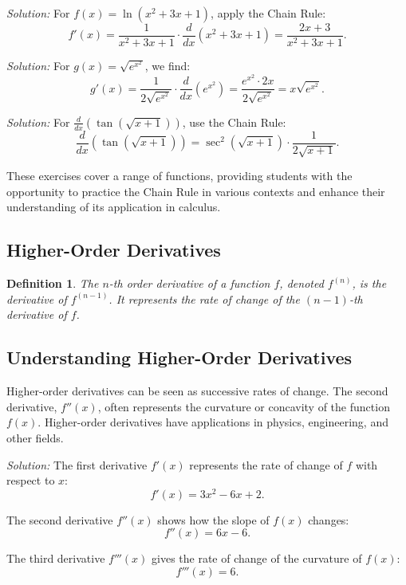 \documentclass[a4paper,12pt]{book}
\newenvironment{solution}[1][]
{\par\noindent\textit{Solution:} \rmfamily}{\medskip}
\newcounter{example}
\newtheorem{definition}{Definition}
\begin{document}
\begin{solution}[to Exercise 2]
For \( f(x) = \ln(x^2 + 3x + 1) \), apply the Chain Rule:
\[ f'(x) = \frac{1}{x^2 + 3x + 1} \cdot \frac{d}{dx}(x^2 + 3x + 1) = \frac{2x + 3}{x^2 + 3x + 1}. \]
\end{solution}

\begin{solution}[to Exercise 3]
For \( g(x) = \sqrt{e^{x^2}} \), we find:
\[ g'(x) = \frac{1}{2\sqrt{e^{x^2}}} \cdot \frac{d}{dx}(e^{x^2}) = \frac{e^{x^2} \cdot 2x}{2\sqrt{e^{x^2}}} = x \sqrt{e^{x^2}}. \]
\end{solution}

\begin{solution}[to Exercise 4]
For \( \frac{d}{dx} \left( \tan(\sqrt{x + 1}) \right) \), use the Chain Rule:
\[ \frac{d}{dx} \left( \tan(\sqrt{x + 1}) \right) = \sec^2(\sqrt{x + 1}) \cdot \frac{1}{2\sqrt{x + 1}}. \]
\end{solution}

These exercises cover a range of functions, providing students with the opportunity to practice the Chain Rule in various contexts and enhance their understanding of its application in calculus.

\subsection{Higher-Order Derivatives}

\begin{definition}
The \( n \)-th order derivative of a function \( f \), denoted \( f^{(n)} \), is the derivative of \( f^{(n-1)} \). It represents the rate of change of the \( (n-1) \)-th derivative of \( f \).
\end{definition}

\subsection{Understanding Higher-Order Derivatives}
Higher-order derivatives can be seen as successive rates of change. The second derivative, \( f''(x) \), often represents the curvature or concavity of the function \( f(x) \). Higher-order derivatives have applications in physics, engineering, and other fields.


\begin{solution}
The first derivative \( f'(x) \) represents the rate of change of \( f \) with respect to \( x \):
\[ f'(x) = 3x^2 - 6x + 2. \]

The second derivative \( f''(x) \) shows how the slope of \( f(x) \) changes:
\[ f''(x) = 6x - 6. \]

The third derivative \( f'''(x) \) gives the rate of change of the curvature of \( f(x) \):
\[ f'''(x) = 6. \]
\end{solution}
\end{document}
